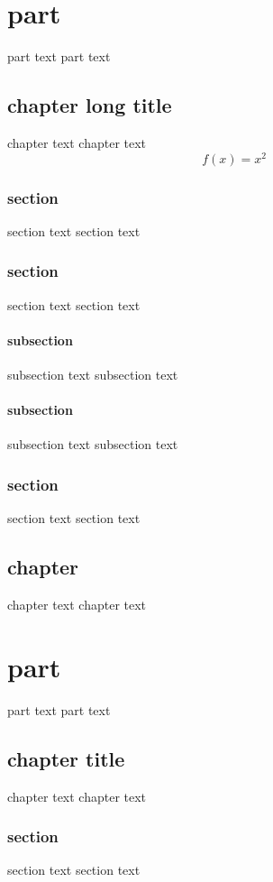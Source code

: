 \part{part}
         part text
         part text
         \chapter{chapter long title}
          chapter text
          chapter text
          \[
          	f(x)=x^2
          \]
          \section[for the toc]{section}
           section text
           section text
          \section[for the toc]{section}
           section text
           section text
          \subsection[for the toc]{subsection}
          	subsection text
          	subsection text
          \subsection[for the toc]{subsection}
          	subsection text
          	subsection text
          \section[for the toc]{section}
           section text
           section text
         \chapter{chapter}
          chapter text
          chapter text
\part{part}
         part text
         part text
         \chapter[toc]{chapter title}
          chapter text
          chapter text
          \section[for the toc]{section}
           section text
           section text
